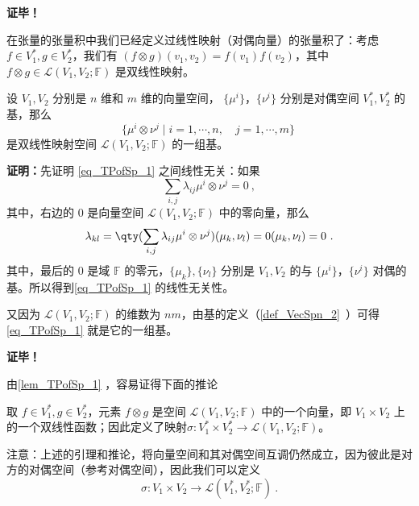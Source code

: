 \textbf{证毕！}

在张量的张量积中我们已经定义过线性映射（对偶向量）的张量积了：考虑 $f \in V^*_1,g \in V^*_2$，我们有 $(f \otimes g)(v_1, v_2) = f(v_1) f(v_2)$，其中 $f \otimes g \in \mathcal L(V_1,V_2;\mathbb F)$ 是双线性映射。

\begin{lemma}{}\label{lem_TPofSp_1}
设 $V_1,V_2$ 分别是 $n$ 维和 $m$ 维的向量空间， $\{\mu^i\}$，$\{\nu^i\}$ 分别是对偶空间 $V^*_1,V^*_2$ 的基，那么
\begin{equation}\label{eq_TPofSp_1}
\{\mu^i\otimes\nu^j \mid i=1,\cdots,n,\quad j=1,\cdots,m \}~
\end{equation}
是双线性映射空间 $\mathcal L(V_1,V_2;\mathbb F)$ 的一组基。
\end{lemma}


\textbf{证明：}先证明 \autoref{eq_TPofSp_1} 之间线性无关：如果
\begin{equation}
\sum_{i,j}\lambda_{ij}\mu^i\otimes\nu^j=0~,
\end{equation}
其中，右边的 $0$ 是向量空间 $\mathcal L(V_1,V_2;\mathbb F)$
中的零向量，那么
\begin{equation}
\lambda_{kl}=\qty(\sum_{i,j}\lambda_{ij}\mu^i\otimes\nu^j)(\mu_k,\nu_l)=0(\mu_k,\nu_l)=0~.
\end{equation}
其中，最后的 $0$ 是域 $\mathbb F$ 的零元，$\{\mu_k\},\{\nu_l\}$ 分别是 $V_1,V_2$ 的与 $\{\mu^i\}$，$\{\nu^i\}$ 对偶的基。所以得到\autoref{eq_TPofSp_1} 的线性无关性。

又因为 $\mathcal L(V_1,V_2;\mathbb F)$ 的维数为 $nm$，由基的定义（\autoref{def_VecSpn_2}~）可得\autoref{eq_TPofSp_1} 就是它的一组基。

\textbf{证毕！}

由\autoref{lem_TPofSp_1} ，容易证得下面的推论
\begin{corollary}{}\label{cor_TPofSp_1}
取 $f \in V^*_1,g \in V^*_2$，元素 $f \otimes g$ 是空间 $\mathcal L(V_1,V_2;\mathbb F)$ 中的一个向量，即 $V_1 \times V_2$ 上的一个双线性函数；因此定义了映射$\sigma: V^*_1 \times V^*_2 \to \mathcal L(V_1,V_2;\mathbb F)$。
\end{corollary}


注意：上述的引理和推论，将向量空间和其对偶空间互调仍然成立，因为彼此是对方的对偶空间（参考对偶空间），因此我们可以定义
\begin{equation}
\sigma: V_1 \times V_2 \to \mathcal L(V^*_1,V^*_2;\mathbb F)~.
\end{equation}

